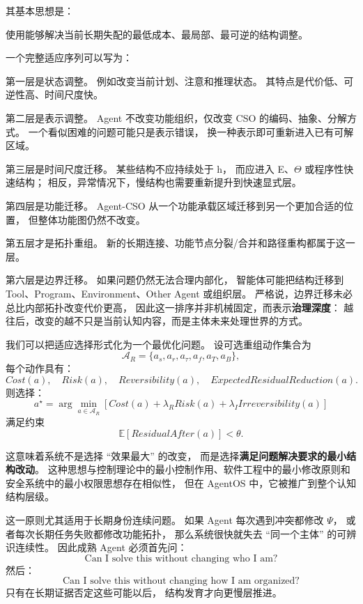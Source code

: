 其基本思想是：
\begin{statementbox}
使用能够解决当前长期失配的最低成本、最局部、最可逆的结构调整。
\end{statementbox}
一个完整适应序列可以写为：
\begin{statementbox}
\centering
{}
\end{statementbox}

第一层是状态调整。
例如改变当前计划、注意和推理状态。
其特点是代价低、可逆性高、时间尺度快。

第二层是表示调整。
Agent 不改变功能组织，仅改变 CSO 的编码、抽象、分解方式。
一个看似困难的问题可能只是表示错误，
换一种表示即可重新进入已有可解区域。

第三层是时间尺度迁移。
某些结构不应持续处于 h，
而应进入 E、$\Theta$ 或程序性快速结构；
相反，异常情况下，慢结构也需要重新提升到快速显式层。

第四层是功能迁移。
Agent-CSO 从一个功能承载区域迁移到另一个更加合适的位置，
但整体功能图仍然不改变。

第五层才是拓扑重组。
新的长期连接、功能节点分裂/合并和路径重构都属于这一层。

第六层是边界迁移。
如果问题仍然无法合理内部化，
智能体可能把结构迁移到 Tool、Program、Environment、Other Agent 或组织层。
严格说，边界迁移未必总比内部拓扑改变代价更高，
因此这一排序并非机械固定，而表示\textbf{治理深度}：
越往后，改变的越不只是当前认知内容，而是主体未来处理世界的方式。

我们可以把适应选择形式化为一个最优化问题。
设可选重组动作集合为
\[
\mathcal A_R
=
\{
a_s,
a_r,
a_\tau,
a_f,
a_T,
a_B
\},
\]
每个动作具有：
\[
Cost(a),
\quad
Risk(a),
\quad
Reversibility(a),
\quad
ExpectedResidualReduction(a).
\]
则选择：
\[
a^\star
=
\arg\min_{a\in\mathcal A_R}
\left[
Cost(a)
+
\lambda_R Risk(a)
+
\lambda_I Irreversibility(a)
\right]
\]
满足约束
\[
\mathbb E
[
ResidualAfter(a)
]
<
\theta.
\]

这意味着系统不是选择 ``效果最大'' 的改变，
而是选择\textbf{满足问题解决要求的最小结构改动}。
这种思想与控制理论中的最小控制作用、软件工程中的最小修改原则和安全系统中的最小权限思想存在相似性，
但在 AgentOS 中，它被推广到整个认知结构层级。

这一原则尤其适用于长期身份连续问题。
如果 Agent 每次遇到冲突都修改 $\Psi$，
或者每次长期任务失败都修改功能拓扑，
那么系统很快就失去 ``同一个主体'' 的可辨识连续性。
因此成熟 Agent 必须首先问：
\[
\text{Can I solve this without changing who I am?}
\]
然后：
\[
\text{Can I solve this without changing how I am organized?}
\]
只有在长期证据否定这些可能以后，
结构发育才向更慢层推进。

